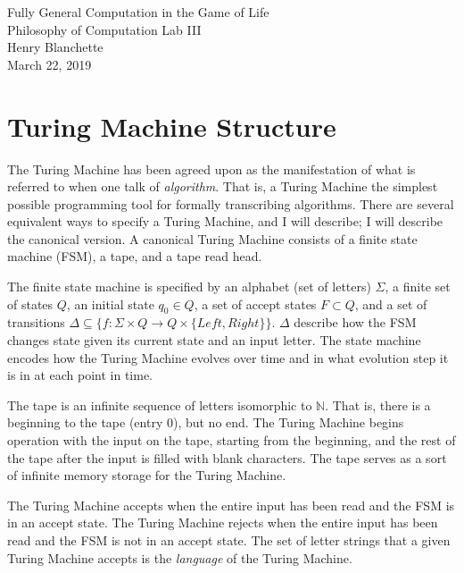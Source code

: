\documentclass{article}
\begin{document}
\begin{center}{\huge   Fully General Computation in the Game of Life }\\[0.4cm]{\large  Philosophy of Computation Lab III }\\[0.75cm]{\large  Henry Blanchette }\\[0.5cm]{\large  March 22, 2019 }\\[1.0cm]\end{center} \tableofcontents\section{Turing Machine Structure}


The Turing Machine has been agreed upon as the manifestation of what is referred to when one talk of \textit{algorithm}. That is, a Turing Machine the simplest possible programming tool for formally transcribing algorithms. There are several equivalent ways to specify a Turing Machine, and I will describe; I will describe the canonical version. A canonical Turing Machine consists of a finite state machine (FSM), a tape, and a tape read head.





The finite state machine is specified by an alphabet (set of letters) $  \Sigma  $, a finite set of states $  Q  $, an initial state $  q_0 \in Q  $, a set of accept states $  F \subset Q  $, and a set of transitions $  \Delta \subseteq \{ f : \Sigma \times Q \rightarrow Q \times \{Left, Right\} \}  $. $  \Delta  $ describe how the FSM changes state given its current state and an input letter. The state machine encodes how the Turing Machine evolves over time and in what evolution step it is in at each point in time.





The tape is an infinite sequence of letters isomorphic to $  \mathbb{N}  $. That is, there is a beginning to the tape (entry 0), but no end. The Turing Machine begins operation with the input on the tape, starting from the beginning, and the rest of the tape after the input is filled with blank characters. The tape serves as a sort of infinite memory storage for the Turing Machine.





The Turing Machine accepts when the entire input has been read and the FSM is in an accept state. The Turing Machine rejects when the entire input has been read and the FSM is not in an accept state. The set of letter strings that a given Turing Machine accepts is the \textit{language} of the Turing Machine.
\end{document}

